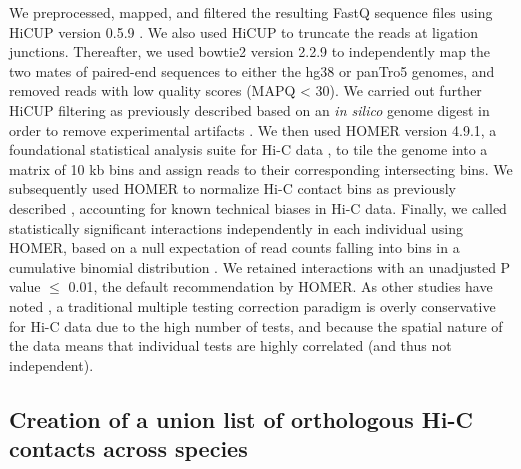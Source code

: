 We preprocessed, mapped, and filtered the resulting FastQ sequence files using HiCUP version 0.5.9 \cite{Wingett.2015}. We also used HiCUP to truncate the reads at ligation junctions. Thereafter, we used bowtie2 version 2.2.9 \cite{Langmead.2012} to independently map the two mates of paired-end sequences to either the hg38 or panTro5 genomes, and removed reads with low quality scores (MAPQ {\textless} 30). We carried out further HiCUP filtering as previously described based on an \textit{in silico} genome digest in order to remove experimental artifacts \cite{Wingett.2015}. We then used HOMER version 4.9.1, a foundational statistical analysis suite for Hi-C data \cite{Heinz.2010}, to tile the genome into a matrix of 10 kb bins and assign reads to their corresponding intersecting bins. We subsequently used HOMER to normalize Hi-C contact bins as previously described \cite{Heinz.2010}, accounting for known technical biases in Hi-C data. Finally, we called statistically significant interactions independently in each individual using HOMER, based on a null expectation of read counts falling into bins in a cumulative binomial distribution \cite{Heinz.2010}. We retained interactions with an unadjusted P value ${\leq}$ 0.01, the default recommendation by HOMER. As other studies have noted \cite{Durand.2016}, a traditional multiple testing correction paradigm is overly conservative for Hi-C data due to the high number of tests, and because the spatial nature of the data means that individual tests are highly correlated (and thus not independent).

\subsection{Creation of a union list of orthologous Hi-C contacts across species}

